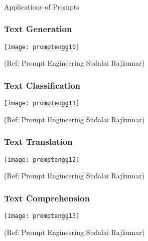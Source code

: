 \begin{frame}[fragile]\frametitle{}
\begin{center}
{\Large Applications of Prompts}
\end{center}
\end{frame}

\begin{frame}[fragile]\frametitle{Text Generation}

\begin{center}
\texttt{[image: promptengg10]}

{\tiny (Ref: Prompt Engineering Sudalai Rajkumar)}

\end{center}		
		


\end{frame}

\begin{frame}[fragile]\frametitle{Text Classification}

\begin{center}
\texttt{[image: promptengg11]}

{\tiny (Ref: Prompt Engineering Sudalai Rajkumar)}

\end{center}		
		


\end{frame}

\begin{frame}[fragile]\frametitle{Text Translation}

\begin{center}
\texttt{[image: promptengg12]}

{\tiny (Ref: Prompt Engineering Sudalai Rajkumar)}

\end{center}		
		


\end{frame}

\begin{frame}[fragile]\frametitle{Text Comprehension}

\begin{center}
\texttt{[image: promptengg13]}

{\tiny (Ref: Prompt Engineering Sudalai Rajkumar)}

\end{center}		
		


\end{frame}

